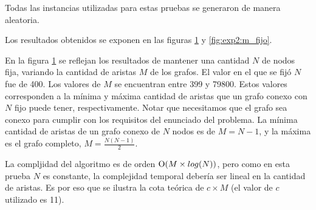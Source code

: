     Todas las instancias utilizadas para estas pruebas se generaron de manera aleatoria. 

    Los resultados obtenidos se exponen en las figuras \ref{fig:exp2:n_fijo} y \ref{fig:exp2:m_fijo}.
    
    \newcommand\constante{11}

    En la figura \ref{fig:exp2:n_fijo} se reflejan los resultados de mantener una cantidad $N$ de nodos fija, variando la cantidad de aristas $M$ de los grafos. El valor en el que se fijó $N$ fue de 400. Los valores de $M$ se encuentran entre 399 y 79800. Estos valores corresponden a la mínima y máxima cantidad de aristas que un grafo conexo con $N$ fijo puede tener, respectivamente. Notar que necesitamos que el grafo sea conexo para cumplir con los requisitos del enunciado del problema. La mínima cantidad de aristas de un grafo conexo de $N$ nodos es de $M = N - 1$, y la máxima es el grafo completo, $M = \frac{N(N - 1)}{2}$.

    La compljidad del algoritmo es de orden $\operatorname{O}(M \times log(N))$, pero como en esta prueba $N$ es constante, la complejidad temporal debería ser lineal en la cantidad de aristas. Es por eso que se ilustra la cota teórica de $c \times M$ (el valor de $c$ utilizado es \constante). 

    \begin{figure}[H]
        \centering
        \caption{}
        \label{fig:exp2:n_fijo}
    \end{figure}

